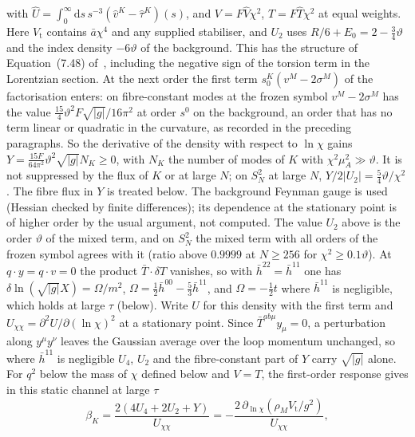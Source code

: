with \(\hat U=\int_0^\infty\mathrm ds\,s^{-3}(\hat v^K-\hat\tau^K)(s)\), and \(V=F\hat V\chi^2\), \(T=F\hat T\chi^2\) at equal weights. Here \(V_{\mathrm t}\) contains \(\bar a\chi^4\) and any supplied stabiliser, and \(U_2\) uses \(R/6+E_0=2-\tfrac34\vartheta\) and the index density \(-6\vartheta\) of the background. This has the structure of Equation~(7.48) of~\cite{Steinacker2023}, including the negative sign of the torsion term in the Lorentzian section. At the next order the first term \(s_0^K(v^M-2\sigma^M)\) of the factorisation enters: on fibre-constant modes at the frozen symbol \(v^M-2\sigma^M\) has the value \(\tfrac{15}{4}\vartheta^2F\sqrt{|g|}/16\pi^2\) at order \(s^0\) on the background, an order that has no term linear or quadratic in the curvature, as recorded in the preceding paragraphs. So the derivative of the density with respect to \(\ln\chi\) gains \(Y=\tfrac{15F}{64\pi^2}\vartheta^2\sqrt{|g|}N_K\ge0\), with \(N_K\) the number of modes of \(K\) with \(\chi^2\mu_A^2\gg\vartheta\). It is not suppressed by the flux of \(K\) or at large \(N\); on \(S^2_N\) at large \(N\), \(Y/2|U_2|=\tfrac54\vartheta/\chi^2\). The fibre flux in \(Y\) is treated below. The background Feynman gauge is used (Hessian checked by finite differences); its dependence at the stationary point is of higher order by the usual argument, not computed. The value \(U_2\) above is the order \(\vartheta\) of the mixed term, and on \(S^2_N\) the mixed term with all orders of the frozen symbol agrees with it (ratio above \(0.9999\) at \(N\ge256\) for \(\chi^2\ge0.1\vartheta\)). At \(q\cdot y=q\cdot v=0\) the product \(\bar T\cdot\delta T\) vanishes, so with \(\bar h^{22}=\bar h^{11}\) one has \(\delta\ln(\sqrt{|g|}X)=\Omega/m^2\), \(\Omega=\tfrac12\bar h^{00}-\tfrac53\bar h^{11}\), and \(\Omega=-\tfrac12t\) where \(\bar h^{11}\) is negligible, which holds at large \(\tau\) (below). Write \(U\) for this density with the first term and \(U_{\chi\chi}=\partial^2U/\partial(\ln\chi)^2\) at a stationary point. Since \(\bar T^{ab\mu}y_\mu=0\), a perturbation along \(y^\mu y^\nu\) leaves the Gaussian average over the loop momentum unchanged, so where \(\bar h^{11}\) is negligible \(U_4\), \(U_2\) and the fibre-constant part of \(Y\) carry \(\sqrt{|g|}\) alone. For \(q^2\) below the mass of \(\chi\) defined below and \(V=T\), the first-order response gives in this static channel at large \(\tau\)
\[
\beta_K=\frac{2(4U_4+2U_2+Y)}{U_{\chi\chi}}=-\frac{2\,\partial_{\ln\chi}(\rho_MV_{\mathrm t}/g^2)}{U_{\chi\chi}},
\]
